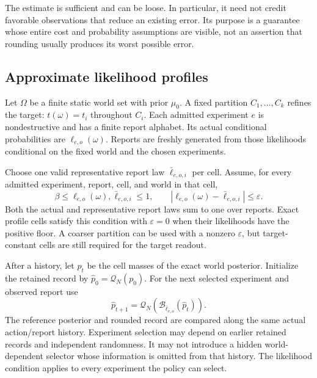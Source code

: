 \documentclass[11pt,letterpaper]{article}
\theoremstyle{plain}
\theoremstyle{definition}
\begin{document}
The estimate is sufficient and can be loose. In particular, it need not credit favorable observations that reduce an existing error. Its purpose is a guarantee whose entire cost and probability assumptions are visible, not an assertion that rounding usually produces its worst possible error.

\subsection{Approximate likelihood profiles}
Let $\Omega$ be a finite static world set with prior $\mu_0$. A fixed partition $C_1,\ldots,C_k$ refines the target: $t(\omega)=t_i$ throughout $C_i$. Each admitted experiment $e$ is nondestructive and has a finite report alphabet. Its actual conditional probabilities are $\ell_{e,o}(\omega)$. Reports are freshly generated from those likelihoods conditional on the fixed world and the chosen experiments.

Choose one valid representative report law $\bar\ell_{e,o,i}$ per cell. Assume, for every admitted experiment, report, cell, and world in that cell,
\[
 \beta\le \ell_{e,o}(\omega),\bar\ell_{e,o,i}\le1,
 \qquad |\ell_{e,o}(\omega)-\bar\ell_{e,o,i}|\le\varepsilon. \tag{10}
\]
Both the actual and representative report laws sum to one over reports. Exact profile cells satisfy this condition with $\varepsilon=0$ when their likelihoods have the positive floor. A coarser partition can be used with a nonzero $\varepsilon$, but target-constant cells are still required for the target readout.

After a history, let $p_t$ be the cell masses of the exact world posterior. Initialize the retained record by $\widehat p_0=\mathcal Q_N(p_0)$. For the next selected experiment and observed report use
\[
 \widehat p_{t+1}=\mathcal Q_N\!\left(\mathcal B_{\bar\ell_{e,o}}(\widehat p_t)\right).
\]
The reference posterior and rounded record are compared along the same actual action/report history. Experiment selection may depend on earlier retained records and independent randomness. It may not introduce a hidden world-dependent selector whose information is omitted from that history. The likelihood condition applies to every experiment the policy can select.
\end{document}
